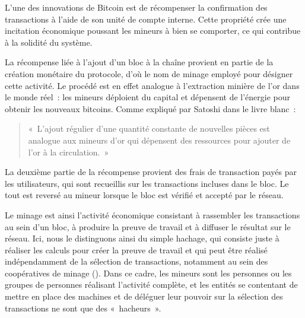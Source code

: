 
L'une des innovations de Bitcoin est de récompenser la confirmation des transactions à l'aide de son unité de compte interne. Cette propriété crée une incitation économique poussant les mineurs à bien se comporter, ce qui contribue à la solidité du système.

La récompense liée à l'ajout d'un bloc à la chaîne provient en partie de la création monétaire du protocole, d'où le nom de minage employé pour désigner cette activité. Le procédé est en effet analogue à l'extraction minière de l'or dans le monde réel~: les mineurs déploient du capital et dépensent de l'énergie pour obtenir les nouveaux bitcoins. Comme expliqué par Satoshi dans le livre blanc~:

\begin{quote}
«~L'ajout régulier d'une quantité constante de nouvelles pièces est analogue aux mineurs d'or qui dépensent des ressources pour ajouter de l'or à la circulation.~»
\end{quote}

La deuxième partie de la récompense provient des frais de transaction payés par les utilisateurs, qui sont recueillis sur les transactions incluses dans le bloc. Le tout est reversé au mineur lorsque le bloc est vérifié et accepté par le réseau. %

Le minage est ainsi l'activité économique consistant à rassembler les transactions au sein d'un bloc, à produire la preuve de travail et à diffuser le résultat sur le réseau. Ici, nous le distinguons ainsi du simple hachage, qui consiste juste à réaliser les calculs pour créer la preuve de travail et qui peut être réalisé indépendamment de la sélection de transactions, notamment au sein des coopératives de minage (). Dans ce cadre, les mineurs sont les personnes ou les groupes de personnes réalisant l'activité complète, et les entités se contentant de mettre en place des machines et de déléguer leur pouvoir sur la sélection des transactions ne sont que des «~hacheurs~».


